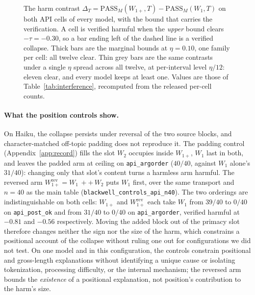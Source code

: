 \documentclass[11pt]{article}
\theoremstyle{plain}
\theoremstyle{definition}
\theoremstyle{remark}
\newcommand{\PASS}{\mathrm{PASS}}
\begin{document}
\begin{figure}[t]
{\begin{tikzpicture}[x=8.2cm, y=0.40cm]
\end{tikzpicture}
}
\caption{The harm contrast $\Delta_T=\PASS_M(W_{1+},T)-\PASS_M(W_1,T)$ on both API cells of every
model, with the bound that carries the verification. A cell is verified harmful when the
\emph{upper} bound clears $-\tau=-0.30$, so a bar ending left of the dashed line is a verified
collapse. Thick bars are the marginal bounds at $\eta=0.10$, one family per cell: all twelve
clear. Thin grey bars are the same contrasts under a single $\eta$ spread across all twelve, at
per-interval level $\eta/12$: eleven clear, and every model keeps at least one. Values are those of
Table~\ref{tab:interference}, recomputed from the released per-cell counts.}
\label{fig:forest}
\end{figure}



\paragraph{What the position controls show.}
On Haiku, the collapse persists under reversal of the two source blocks, and character-matched
off-topic padding does not reproduce it. The padding control (Appendix~\ref{app:record}) fills
the slot $W_2$ occupies inside $W_{1+}$, $W_1$ last in both, and leaves the padded arm at ceiling
on \texttt{api\_argorder} ($40/40$, against $W_1$ alone's $31/40$): changing only that slot's
content turns a harmless arm harmful. The
reversed arm $W_{1+}^{\mathrm{rev}} = W_1 \,{+}{+}\, W_2$ puts $W_1$ first, over the same
transport and $n=40$ as the main table (\texttt{blackwell\_controls\_api\_n40}). The two
orderings are indistinguishable on both cells: $W_{1+}$ and $W_{1+}^{\mathrm{rev}}$ each take
$W_1$ from $39/40$ to $0/40$ on \texttt{api\_post\_ok} and from $31/40$ to $0/40$ on
\texttt{api\_argorder}, verified harmful at $-0.81$ and $-0.56$ respectively. Moving the added
block out of the primacy slot therefore changes neither the sign nor the size of the harm, which
constrains a positional account of the collapse without ruling one out for configurations we did
not test. On one model and in this configuration, the controls constrain positional and
gross-length explanations without identifying a unique cause or isolating tokenization,
processing difficulty, or the internal mechanism; the reversed arm bounds the \emph{existence}
of a positional explanation, not position's contribution to the harm's size.
\end{document}
